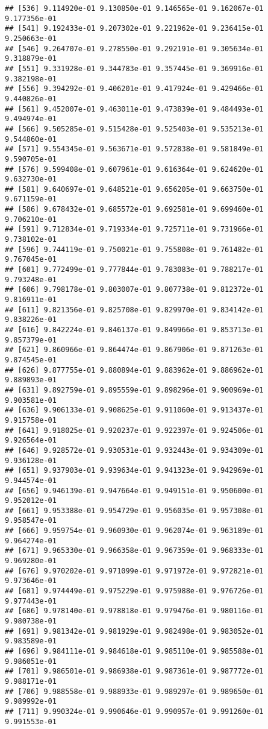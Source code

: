 \documentclass[
]{article}
\begin{document}
\begin{verbatim}
## [536] 9.114920e-01 9.130850e-01 9.146565e-01 9.162067e-01 9.177356e-01
## [541] 9.192433e-01 9.207302e-01 9.221962e-01 9.236415e-01 9.250663e-01
## [546] 9.264707e-01 9.278550e-01 9.292191e-01 9.305634e-01 9.318879e-01
## [551] 9.331928e-01 9.344783e-01 9.357445e-01 9.369916e-01 9.382198e-01
## [556] 9.394292e-01 9.406201e-01 9.417924e-01 9.429466e-01 9.440826e-01
## [561] 9.452007e-01 9.463011e-01 9.473839e-01 9.484493e-01 9.494974e-01
## [566] 9.505285e-01 9.515428e-01 9.525403e-01 9.535213e-01 9.544860e-01
## [571] 9.554345e-01 9.563671e-01 9.572838e-01 9.581849e-01 9.590705e-01
## [576] 9.599408e-01 9.607961e-01 9.616364e-01 9.624620e-01 9.632730e-01
## [581] 9.640697e-01 9.648521e-01 9.656205e-01 9.663750e-01 9.671159e-01
## [586] 9.678432e-01 9.685572e-01 9.692581e-01 9.699460e-01 9.706210e-01
## [591] 9.712834e-01 9.719334e-01 9.725711e-01 9.731966e-01 9.738102e-01
## [596] 9.744119e-01 9.750021e-01 9.755808e-01 9.761482e-01 9.767045e-01
## [601] 9.772499e-01 9.777844e-01 9.783083e-01 9.788217e-01 9.793248e-01
## [606] 9.798178e-01 9.803007e-01 9.807738e-01 9.812372e-01 9.816911e-01
## [611] 9.821356e-01 9.825708e-01 9.829970e-01 9.834142e-01 9.838226e-01
## [616] 9.842224e-01 9.846137e-01 9.849966e-01 9.853713e-01 9.857379e-01
## [621] 9.860966e-01 9.864474e-01 9.867906e-01 9.871263e-01 9.874545e-01
## [626] 9.877755e-01 9.880894e-01 9.883962e-01 9.886962e-01 9.889893e-01
## [631] 9.892759e-01 9.895559e-01 9.898296e-01 9.900969e-01 9.903581e-01
## [636] 9.906133e-01 9.908625e-01 9.911060e-01 9.913437e-01 9.915758e-01
## [641] 9.918025e-01 9.920237e-01 9.922397e-01 9.924506e-01 9.926564e-01
## [646] 9.928572e-01 9.930531e-01 9.932443e-01 9.934309e-01 9.936128e-01
## [651] 9.937903e-01 9.939634e-01 9.941323e-01 9.942969e-01 9.944574e-01
## [656] 9.946139e-01 9.947664e-01 9.949151e-01 9.950600e-01 9.952012e-01
## [661] 9.953388e-01 9.954729e-01 9.956035e-01 9.957308e-01 9.958547e-01
## [666] 9.959754e-01 9.960930e-01 9.962074e-01 9.963189e-01 9.964274e-01
## [671] 9.965330e-01 9.966358e-01 9.967359e-01 9.968333e-01 9.969280e-01
## [676] 9.970202e-01 9.971099e-01 9.971972e-01 9.972821e-01 9.973646e-01
## [681] 9.974449e-01 9.975229e-01 9.975988e-01 9.976726e-01 9.977443e-01
## [686] 9.978140e-01 9.978818e-01 9.979476e-01 9.980116e-01 9.980738e-01
## [691] 9.981342e-01 9.981929e-01 9.982498e-01 9.983052e-01 9.983589e-01
## [696] 9.984111e-01 9.984618e-01 9.985110e-01 9.985588e-01 9.986051e-01
## [701] 9.986501e-01 9.986938e-01 9.987361e-01 9.987772e-01 9.988171e-01
## [706] 9.988558e-01 9.988933e-01 9.989297e-01 9.989650e-01 9.989992e-01
## [711] 9.990324e-01 9.990646e-01 9.990957e-01 9.991260e-01 9.991553e-01

\end{verbatim}
\end{document}
